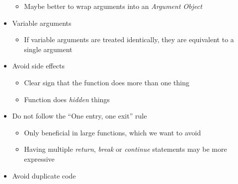 \begin{itemize}
\begin{itemize}
        \item Maybe better to wrap arguments into an \textit{Argument Object}
    \end{itemize}
    \item Variable arguments
    \begin{itemize}
        \item If variable arguments are treated identically, they are equivalent to a single argument
    \end{itemize}
    \item Avoid side effects
    \begin{itemize}
        \item Clear sign that the function does more than one thing
        \item Function does \textit{hidden} things
    \end{itemize}
    \item Do not follow the ``One entry, one exit'' rule
    \begin{itemize}
        \item Only beneficial in large functions, which we want to avoid
        \item Having multiple \textit{return}, \textit{break} or \textit{continue} statements may be more expressive
    \end{itemize}
    \item Avoid duplicate code
\end{itemize}
